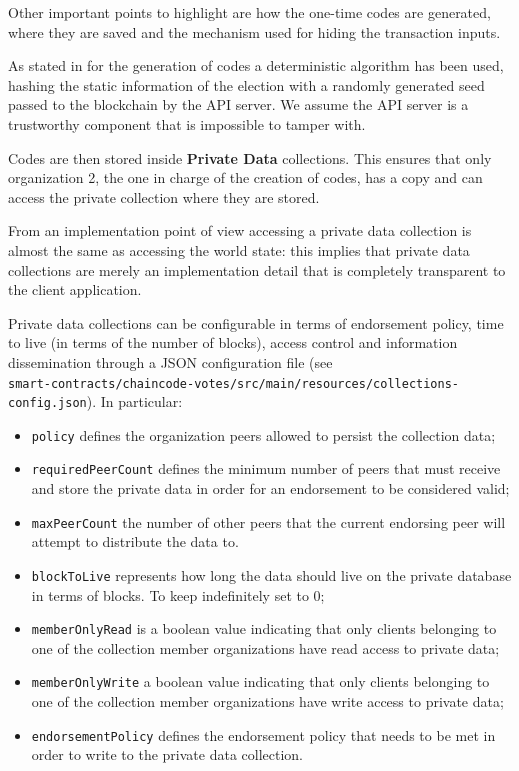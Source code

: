 \documentclass{scrartcl}
\begin{document}
Other important points to highlight are how the one-time codes are generated, where they are saved and the mechanism used for hiding the transaction inputs. 

As stated in  for the generation of codes a deterministic algorithm has been used, hashing the static information of the election with a randomly generated seed passed to the blockchain by the API server.
%
We assume the API server is a trustworthy component that is impossible to tamper with.

Codes are then stored inside \textbf{Private Data} collections.
%
This ensures that only organization 2, the one in charge of the creation of codes, has a copy and can access the private collection where they are stored.

From an implementation point of view accessing a private data collection is almost the same as accessing the world state: this implies that private data collections are merely an implementation detail that is completely transparent to the client application.


Private data collections can be configurable in terms of endorsement policy, time to live (in terms of the number of blocks), access control and information dissemination through a JSON configuration file (see \\ \texttt{smart-contracts/chaincode-votes/src/main/resources/collections-config.json}).
%
In particular:
\begin{itemize}
    \item \texttt{policy} defines the organization peers allowed to persist the collection data;
    \item \texttt{requiredPeerCount} defines the minimum number of peers that must receive and store the private data in order for an endorsement to be considered valid;
    \item \texttt{maxPeerCount} the number of other peers that the current endorsing peer will attempt to distribute the data to.
    \item \texttt{blockToLive} represents how long the data should live on the private database in terms of blocks. To keep indefinitely set to 0;
    \item \texttt{memberOnlyRead} is a boolean value indicating that  only clients belonging to one of the collection member organizations have read access to private data;
    \item \texttt{memberOnlyWrite} a boolean value indicating that only clients belonging to one of the collection member organizations have write access to private data;
    \item \texttt{endorsementPolicy} defines the endorsement policy that needs to be met in order to write to the private data collection.
\end{itemize}
\end{document}
